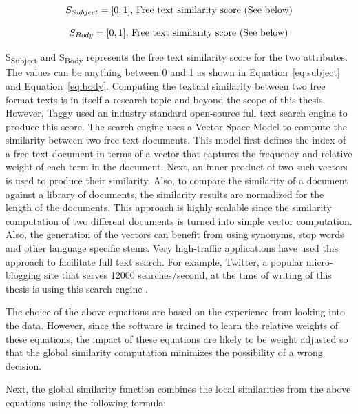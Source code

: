 \begin{equation}
\label{eq:subject}
S_{Subject} = [0, 1]\mbox{, Free text similarity score (See below)}\\
\end{equation}

\begin{equation}
\label{eq:body}
S_{Body} = [0, 1]\mbox{, Free text similarity score (See below)}\\
\end{equation}

S\textsubscript{Subject} and S\textsubscript{Body} represents the free text similarity score for the two attributes. The values can be anything between 0 and 1 as shown in Equation~\ref{eq:subject} and Equation~\ref{eq:body}. Computing the textual similarity between two free format texts is in itself a research topic and beyond the scope of this thesis. However, Taggy used an industry standard open-source full text search engine to produce this score. The search engine uses a Vector Space Model \cite{a_vector_space} to compute the similarity between two free text documents. This model first defines the index of a free text document in terms of a vector that captures the frequency and relative weight of each term in the document. Next, an inner product of two such vectors is used to produce their similarity. Also, to compare the similarity of a document against a library of documents, the similarity results are normalized for the length of the documents. This approach is highly scalable since the similarity computation of two different documents is turned into simple vector computation. Also, the generation of the vectors can benefit from using synonyms, stop words and other language specific stems. Very high-traffic applications have used this approach to facilitate full text search. For example, Twitter, a popular micro-blogging site that serves 12000 searches/second, at the time of writing of this thesis is using this search engine \cite{twitter_lucene}.

The choice of the above equations are based on the experience from looking into the data. However, since the software is trained to learn the relative weights of these equations, the impact of these equations are likely to be weight adjusted so that the global similarity computation minimizes the possibility of a wrong decision.

Next, the global similarity function combines the local similarities from the above equations using the following formula:

